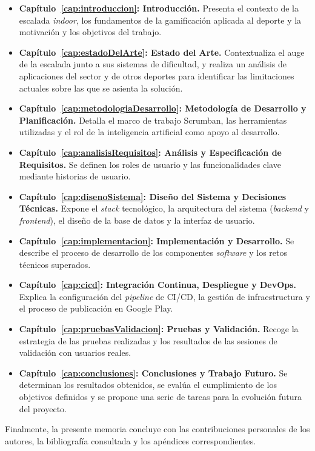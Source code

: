 \begin{itemize}
    \item \textbf{Capítulo~\ref{cap:introduccion}: Introducción.} Presenta el contexto de la escalada \textit{indoor}, los fundamentos de la gamificación aplicada al deporte y la motivación y los objetivos del trabajo.

    \item \textbf{Capítulo~\ref{cap:estadoDelArte}: Estado del Arte.} Contextualiza el auge de la escalada junto a sus sistemas de dificultad, y realiza un análisis de aplicaciones del sector y de otros deportes para identificar las limitaciones actuales sobre las que se asienta la solución.

    \item \textbf{Capítulo~\ref{cap:metodologiaDesarrollo}: Metodología de Desarrollo y Planificación.} Detalla el marco de trabajo Scrumban, las herramientas utilizadas y el rol de la inteligencia artificial como apoyo al desarrollo.

    \item \textbf{Capítulo~\ref{cap:analisisRequisitos}: Análisis y Especificación de Requisitos.} Se definen los roles de usuario y las funcionalidades clave mediante historias de usuario.

    \item \textbf{Capítulo~\ref{cap:disenoSistema}: Diseño del Sistema y Decisiones Técnicas.} Expone el \textit{stack} tecnológico, la arquitectura del sistema (\textit{backend} y \textit{frontend}), el diseño de la base de datos y la interfaz de usuario.

    \item \textbf{Capítulo~\ref{cap:implementacion}: Implementación y Desarrollo.} Se describe el proceso de desarrollo de los componentes \textit{software} y los retos técnicos superados.

    \item \textbf{Capítulo~\ref{cap:cicd}: Integración Continua, Despliegue y DevOps.} Explica la configuración del \textit{pipeline} de CI/CD, la gestión de infraestructura y el proceso de publicación en Google Play.

    \item \textbf{Capítulo~\ref{cap:pruebasValidacion}: Pruebas y Validación.} Recoge la estrategia de las pruebas realizadas y los resultados de las sesiones de validación con usuarios reales.

    \item \textbf{Capítulo~\ref{cap:conclusiones}: Conclusiones y Trabajo Futuro.} Se determinan los resultados obtenidos, se evalúa el cumplimiento de los objetivos definidos y se propone una serie de tareas para la evolución futura del proyecto.
\end{itemize}

Finalmente, la presente memoria concluye con las contribuciones personales de los autores, la bibliografía consultada y los apéndices correspondientes.
